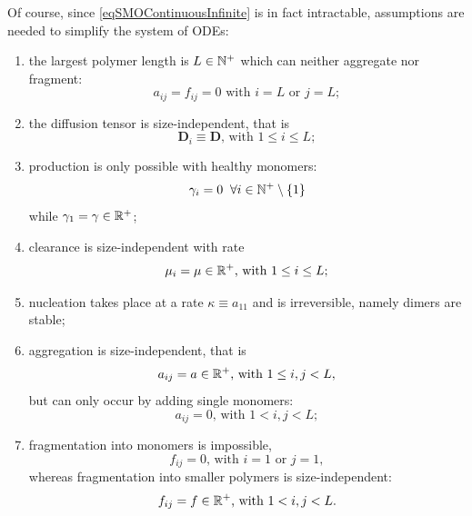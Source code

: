 \documentclass{article}
\begin{document}
                Of course, since \eqref{eqSMOContinuousInfinite} is in fact intractable, assumptions are needed to simplify the system of ODEs:

                \begin{enumerate}[
                    label=A\arabic*,  %
                    topsep=7.5pt,     %
                    itemsep=-1pt,	  %
                    leftmargin=30pt,  %
                    rightmargin=20pt, %
                ]
                    \item\label{hypSMOModelMaxLength} the largest polymer length is $L\in\mathbb N^+$ which can neither aggregate nor fragment: \[a_{ij}=f_{ij}=0\text{ with }i=L\text{ or }j=L;\]
                    \item\label{hypSMOModelDiffusion} the diffusion tensor is size-independent, that is \[\mathbf D_i\equiv\mathbf D\text{, with }1\le i\le L;\]
                    \item\label{hypSMOModelProduction} production is only possible with healthy mo\-no\-mers: \[\gamma_i=0\;\;\forall i\in\mathbb N^+\setminus\{1\}\]while $\gamma_1=\gamma\in\mathbb R^+$;
                    \item\label{hypSMOModelClearance} clearance is size-independent with rate \[\mu_i=\mu\in\mathbb R^+\text{, with }1\le i\le L;\]
                    \item\label{hypSMOModelNucleation} nucleation takes place at a rate $\kappa\equiv a_{11}$ and is irreversible, namely dimers are stable;
                    \item\label{hypSMOModelAggregation} aggregation is size-independent, that is \[a_{ij}=a\in\mathbb R^+\text{, with }1\le i,j<L,\]but can only occur by adding single monomers: \[a_{ij}=0\text{, with }1<i,j<L;\]
                    \item\label{hypSMOModelFragmentation} fragmentation into monomers is impossible, \ie{} \[f_{ij}=0\text{, with }i=1\text{ or }j=1,\]whereas fragmentation into smaller polymers is size-in\-de\-pen\-dent: \[f_{ij}=f\in\mathbb R^+\text{, with }1<i,j<L.\]
                \end{enumerate}
\end{document}
